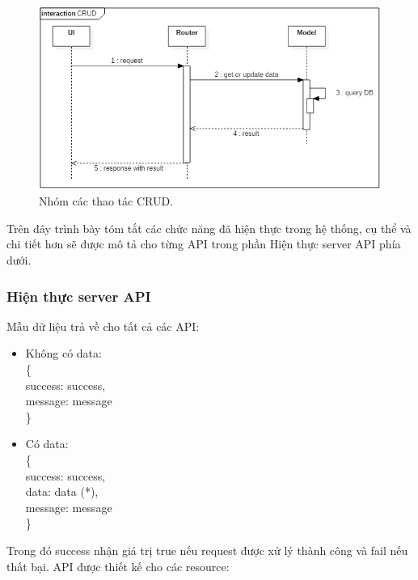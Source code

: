 \documentclass[a4paper,12pt,oneside]{article}
\begin{document}
\begin{itemize}
	\begin{figure}[H]
		\centering
		\includegraphics[scale=.65]{hinh/seq-CRUD.png}
		\caption{Nhóm các thao tác CRUD.}
	\end{figure}
	
	Trên đây trình bày tóm tắt các chức năng đã hiện thực trong hệ thống, cụ thể và chi tiết hơn sẽ được mô tả cho từng API trong phần Hiện thực server API phía dưới.
\end{itemize}

\subsubsection{Hiện thực server API}

\noindent Mẫu dữ liệu trả về cho tất cả các API:
\begin{itemize}
\item Không có data:\\
\{\\
\hspace{\labelwidth}success: success,\\
\hspace{\labelwidth}message: message\\
\}
\item Có data:\\
\{\\
\hspace{\labelwidth} success: success,\\
\hspace{\labelwidth} data: data (*),\\
\hspace{\labelwidth} message: message\\
\}

\end{itemize}
Trong đó success nhận giá trị true nếu request được xử lý thành công và fail nếu thất bại.
\noindent API được thiết kế cho các resource:
\end{document}
